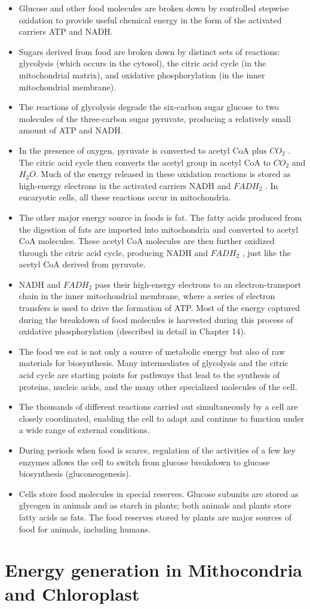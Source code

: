 \begin{itemize}
\item Glucose and other food molecules are broken down by controlled
stepwise oxidation to provide useful chemical energy in the form of
the activated carriers ATP and NADH.
\item Sugars derived from food are broken down by distinct sets of reactions:
glycolysis (which occurs in the cytosol), the citric acid cycle
(in the mitochondrial matrix), and oxidative phosphorylation (in the
inner mitochondrial membrane).
\item The reactions of glycolysis degrade the six-carbon sugar glucose to
two molecules of the three-carbon sugar pyruvate, producing a relatively
small amount of ATP and NADH.
\item In the presence of oxygen, pyruvate is converted to acetyl CoA plus
$CO_2$ . The citric acid cycle then converts the acetyl group in acetyl
CoA to $CO_2$ and $H_{2}O$. Much of the energy released in these oxidation
reactions is stored as high-energy electrons in the activated carriers
NADH and $FADH_2$ . In eucaryotic cells, all these reactions occur in
mitochondria.
\item The other major energy source in foods is fat. The fatty acids produced
from the digestion of fats are imported into mitochondria and
converted to acetyl CoA molecules. These acetyl CoA molecules are
then further oxidized through the citric acid cycle, producing NADH
and $FADH_2$ , just like the acetyl CoA derived from pyruvate.
\item NADH and $FADH_2$ pass their high-energy electrons to an electron-transport
chain in the inner mitochondrial membrane, where a series
of electron transfers is used to drive the formation of ATP. Most of
the energy captured during the breakdown of food molecules is harvested
during this process of oxidative phosphorylation (described in
detail in Chapter 14).
\item The food we eat is not only a source of metabolic energy but also of
raw materials for biosynthesis. Many intermediates of glycolysis and
the citric acid cycle are starting points for pathways that lead to the
synthesis of proteins, nucleic acids, and the many other specialized
molecules of the cell.
\item The thousands of different reactions carried out simultaneously by a
cell are closely coordinated, enabling the cell to adapt and continue
to function under a wide range of external conditions.
\item During periods when food is scarce, regulation of the activities of a
few key enzymes allows the cell to switch from glucose breakdown
to glucose biosynthesis (gluconeogenesis).
\item Cells store food molecules in special reserves. Glucose subunits are
stored as glycogen in animals and as starch in plants; both animals
and plants store fatty acids as fats. The food reserves stored by plants
are major sources of food for animals, including humans.
\end{itemize}

\chapter{Energy generation in Mithocondria and Chloroplast}
